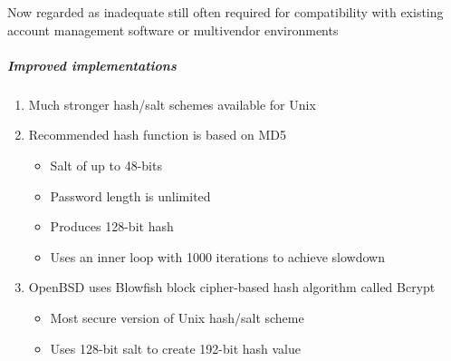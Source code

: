 \documentclass{article}
\begin{document}
                Now regarded as inadequate still often required for compatibility with
                existing account management software or
                multivendor environments
                \subparagraph{Improved implementations}

                    \begin{enumerate}
                        \item Much stronger hash/salt schemes available for Unix
                        \item Recommended hash function is based on MD5
                        \begin{itemize}
                            \item Salt of up to 48-bits
                            \item Password length is unlimited
                            \item Produces 128-bit hash
                            \item Uses an inner loop with 1000 iterations to achieve slowdown
                        \end{itemize}
                        \item OpenBSD uses Blowfish block cipher-based hash algorithm called Bcrypt
                            \begin{itemize}
                                \item Most secure version of Unix hash/salt scheme
                                \item Uses 128-bit salt to create 192-bit hash value
                            \end{itemize}
                       
                    \end{enumerate}
\end{document}
